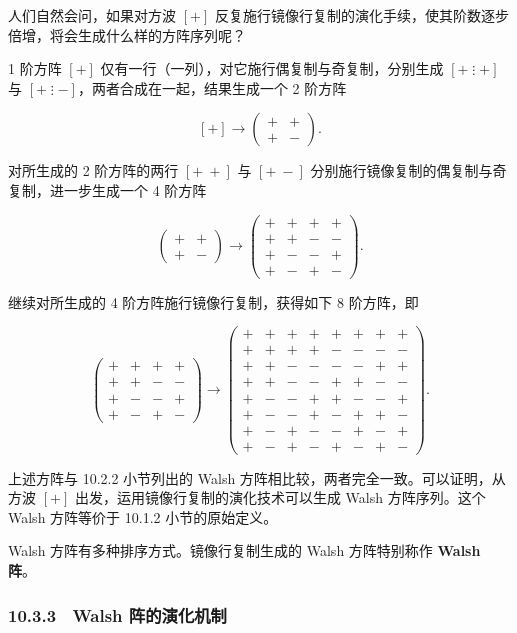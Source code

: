 \documentclass[
  10pt,
  fontset=fandol]{ctexart}
\begin{document}
人们自然会问，如果对方波 \([+]\) 反复施行镜像行复制的演化手续，使其阶数逐步倍增，将会生成什么样的方阵序列呢？

1 阶方阵 \([+]\) 仅有一行（一列），对它施行偶复制与奇复制，分别生成 \([+\mathrel{\vdots}+]\) 与 \([+\mathrel{\vdots}-]\)，两者合成在一起，结果生成一个 2 阶方阵

\[
[+]\longrightarrow\begin{pmatrix}+&+\\+&-\end{pmatrix}.
\]

对所生成的 2 阶方阵的两行 \([+\ +]\) 与 \([+\ -]\) 分别施行镜像复制的偶复制与奇复制，进一步生成一个 4 阶方阵

\[
\begin{pmatrix}+&+\\+&-\end{pmatrix}\longrightarrow
\begin{pmatrix}
+&+&+&+\\
+&+&-&-\\
+&-&-&+\\
+&-&+&-
\end{pmatrix}.
\]

继续对所生成的 4 阶方阵施行镜像行复制，获得如下 8 阶方阵，即

\[
\begin{pmatrix}
+&+&+&+\\
+&+&-&-\\
+&-&-&+\\
+&-&+&-
\end{pmatrix}\longrightarrow
\begin{pmatrix}
+&+&+&+&+&+&+&+\\
+&+&+&+&-&-&-&-\\
+&+&-&-&-&-&+&+\\
+&+&-&-&+&+&-&-\\
+&-&-&+&+&-&-&+\\
+&-&-&+&-&+&+&-\\
+&-&+&-&-&+&-&+\\
+&-&+&-&+&-&+&-
\end{pmatrix}.
\]

上述方阵与 10.2.2 小节列出的 Walsh 方阵相比较，两者完全一致。可以证明，从方波 \([+]\) 出发，运用镜像行复制的演化技术可以生成 Walsh 方阵序列。这个 Walsh 方阵等价于 10.1.2 小节的原始定义。

Walsh 方阵有多种排序方式。镜像行复制生成的 Walsh 方阵特别称作 \textbf{Walsh 阵}。

\subsubsection{10.3.3　Walsh 阵的演化机制}\label{walsh-ux9635ux7684ux6f14ux5316ux673aux5236}
\end{document}
